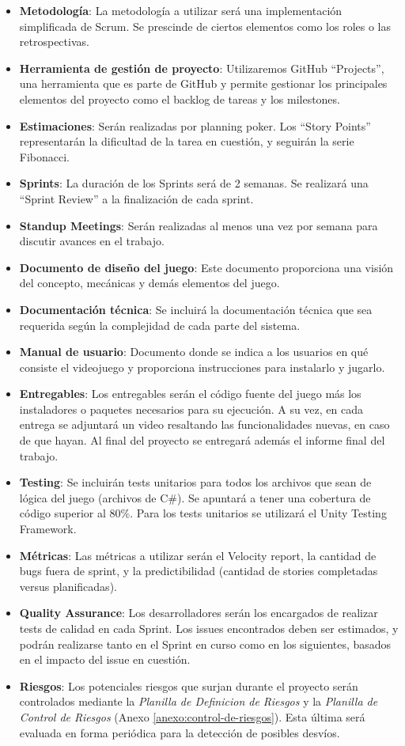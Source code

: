 \documentclass[a4paper]{article}
\begin{document}
\begin{itemize}
    \item \textbf{Metodología}: La metodología a utilizar será una implementación simplificada de Scrum. Se prescinde de ciertos elementos como los roles o las retrospectivas.
    \item \textbf{Herramienta de gestión de proyecto}: Utilizaremos GitHub “Projects”, una herramienta que es parte de GitHub y permite gestionar los principales elementos del proyecto como el backlog de tareas y los milestones.
    \item \textbf{Estimaciones}: Serán realizadas por planning poker. Los “Story Points” representarán la dificultad de la tarea en cuestión, y seguirán la serie Fibonacci.
    \item \textbf{Sprints}: La duración de los Sprints será de 2 semanas. Se realizará una “Sprint Review” a la finalización de cada sprint.
    \item \textbf{Standup Meetings}: Serán realizadas al menos una vez por semana para discutir avances en el trabajo.
    \item \textbf{Documento de diseño del juego}: Este documento proporciona una visión del concepto, mecánicas y demás elementos del juego.
    \item \textbf{Documentación técnica}: Se incluirá la documentación técnica que sea requerida según la complejidad de cada parte del sistema.
    \item \textbf{Manual de usuario}: Documento donde se indica a los usuarios en qué consiste el videojuego y proporciona instrucciones para instalarlo y jugarlo.
    \item \textbf{Entregables}: Los entregables serán el código fuente del juego más los instaladores o paquetes necesarios para su ejecución. A su vez, en cada entrega se adjuntará un video resaltando las funcionalidades nuevas, en caso de que hayan. Al final del proyecto se entregará además el informe final del trabajo.
    \item \textbf{Testing}: Se incluirán tests unitarios para todos los archivos que sean de lógica del juego (archivos de C\#). Se apuntará a tener una cobertura de código superior al 80\%. Para los tests unitarios se utilizará el Unity Testing Framework.
    \item \textbf{Métricas}: Las métricas a utilizar serán el Velocity report, la cantidad de bugs fuera de sprint, y la predictibilidad (cantidad de stories completadas versus planificadas).
    \item \textbf{Quality Assurance}: Los desarrolladores serán los encargados de realizar tests de calidad en cada Sprint. Los issues encontrados deben ser estimados, y podrán realizarse tanto en el Sprint en curso como en los siguientes, basados en el impacto del issue en cuestión.
    \item \textbf{Riesgos}: Los potenciales riesgos que surjan durante el proyecto serán controlados mediante la \textit{Planilla de Definicion de Riesgos} y la \textit{Planilla de Control de Riesgos} (Anexo \ref{anexo:control-de-riesgos}). Esta última será evaluada en forma periódica para la detección de posibles desvíos.
\end{itemize}
\end{document}
